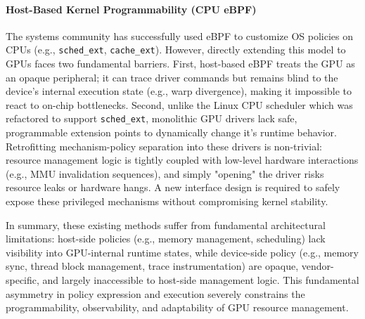 \paragraph{Host-Based Kernel Programmability (CPU eBPF)}
The systems community has successfully used eBPF to customize OS policies on CPUs (e.g., \texttt{sched\_ext}, \texttt{cache\_ext}). However, directly extending this model to GPUs faces two fundamental barriers. First, host-based eBPF treats the GPU as an opaque peripheral; it can trace driver commands but remains blind to the device's internal execution state (e.g., warp divergence), making it impossible to react to on-chip bottlenecks. Second, unlike the Linux CPU scheduler which was refactored to support \texttt{sched\_ext}, monolithic GPU drivers lack safe, programmable extension points to dynamically change it's runtime behavior. Retrofitting mechanism-policy separation into these drivers is non-trivial: resource management logic is tightly coupled with low-level hardware interactions (e.g., MMU invalidation sequences), and simply "opening" the driver risks resource leaks or hardware hangs. A new interface design is required to safely expose these privileged mechanisms without compromising kernel stability.

In summary, these existing methods suffer from fundamental architectural limitations: host-side policies (e.g., memory management, scheduling) lack visibility into GPU-internal runtime states, while device-side policy (e.g., memory sync, thread block management, trace instrumentation) are opaque, vendor-specific, and largely inaccessible to host-side management logic. This fundamental asymmetry in policy expression and execution severely constrains the programmability, observability, and adaptability of GPU resource management.
